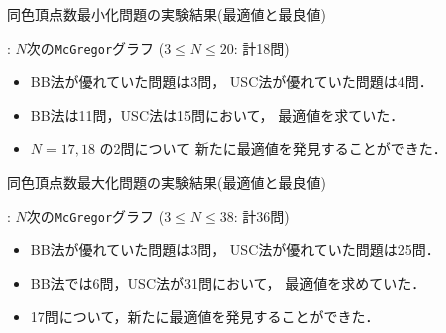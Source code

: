 \documentclass[dvipdfmx,11pt]{beamer}
\newcommand{\code}[1]{\lstinline[basicstyle=\ttfamily]{#1}}
\begin{document}
\begin{frame}{同色頂点数最小化問題の実験結果(最適値と最良値)}
 \begin{block}{}
  : $N$次の\code{McGregor}グラフ ($3 \leq N\leq 20$: 計18問)
 \end{block}

 \begin{center}
 \end{center}

 \begin{itemize}
  \item BB法が優れていた問題は3問，
        USC法が優れていた問題は4問．
  \item BB法は11問，USC法は15問において，
	最適値を求ていた．
  \item $N = 17,18$ の2問について
	新たに最適値を発見することができた．
 \end{itemize}
\end{frame}

\begin{frame}{同色頂点数最大化問題の実験結果(最適値と最良値)}
 \begin{block}{}
  : $N$次の\code{McGregor}グラフ ($3 \leq N\leq 38$: 計36問)
 \end{block}
 
 \begin{center}
 \end{center}

 \begin{itemize}
  \item BB法が優れていた問題は3問，
        USC法が優れていた問題は25問．
  \item BB法では6問，USC法が31問において，
	最適値を求めていた．
  \item 17問について，新たに最適値を発見することができた．
 \end{itemize}
\end{frame}
\end{document}
